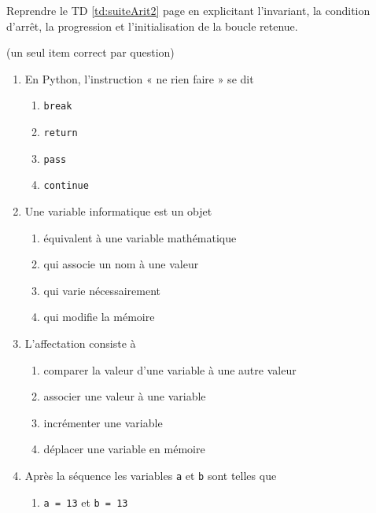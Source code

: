 \begin{td}\label{td:suiteArit3}
Reprendre le TD \ref{td:suiteArit2} page \pageref{td:suiteArit2} en explicitant l'invariant, la condition d'arrêt,
la progression et l'initialisation de la boucle retenue.
\end{td}

\begin{td}[QCM (2)]\label{td:qcmInstruc}(un seul item correct par question)
\em
\begin{enumerate}
\item En {\sc Python}, l'instruction « ne rien faire » se dit
	\begin{enumerate}
	\item {\tt break}
	\item {\tt return}
	\item {\tt pass}
	\item {\tt continue}
	\end{enumerate}
\item Une variable informatique est un objet 
	\begin{enumerate}
	\item équivalent à une variable mathématique
	\item qui associe un nom à une valeur
	\item qui varie nécessairement
	\item qui modifie la mémoire
	\end{enumerate}
\item L'affectation consiste à
	\begin{enumerate}
	\item comparer la valeur d'une variable à une autre valeur
	\item associer une valeur à une variable
	\item incrémenter une variable
	\item déplacer une variable en mémoire
	\end{enumerate}
\item Après la séquence  les variables {\tt a} et {\tt b} sont telles que
	\begin{enumerate}
	\item {\tt a = 13} et {\tt b = 13}

\end{enumerate}
\end{enumerate}
\end{td}
